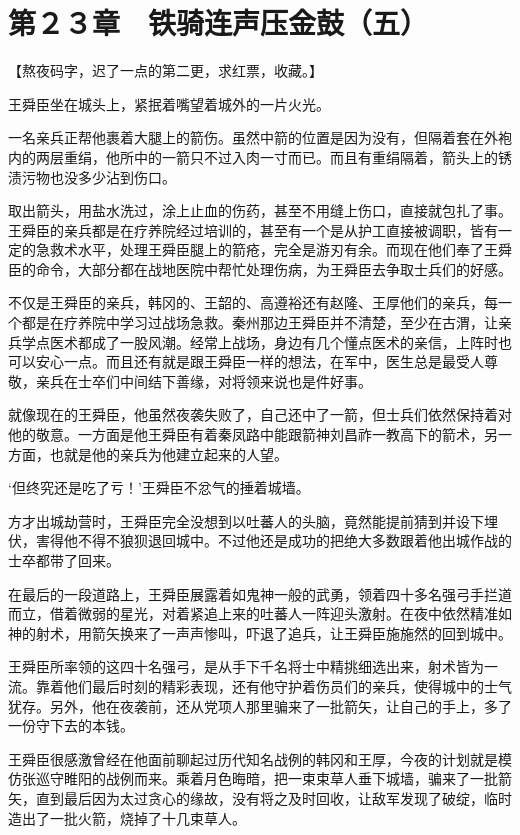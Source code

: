 \section{第２３章　铁骑连声压金鼓（五）}

【熬夜码字，迟了一点的第二更，求红票，收藏。】

王舜臣坐在城头上，紧抿着嘴望着城外的一片火光。

一名亲兵正帮他裹着大腿上的箭伤。虽然中箭的位置是因为没有，但隔着套在外袍内的两层重绢，他所中的一箭只不过入肉一寸而已。而且有重绢隔着，箭头上的锈渍污物也没多少沾到伤口。

取出箭头，用盐水洗过，涂上止血的伤药，甚至不用缝上伤口，直接就包扎了事。王舜臣的亲兵都是在疗养院经过培训的，甚至有一个是从护工直接被调职，皆有一定的急救术水平，处理王舜臣腿上的箭疮，完全是游刃有余。而现在他们奉了王舜臣的命令，大部分都在战地医院中帮忙处理伤病，为王舜臣去争取士兵们的好感。

不仅是王舜臣的亲兵，韩冈的、王韶的、高遵裕还有赵隆、王厚他们的亲兵，每一个都是在疗养院中学习过战场急救。秦州那边王舜臣并不清楚，至少在古渭，让亲兵学点医术都成了一股风潮。经常上战场，身边有几个懂点医术的亲信，上阵时也可以安心一点。而且还有就是跟王舜臣一样的想法，在军中，医生总是最受人尊敬，亲兵在士卒们中间结下善缘，对将领来说也是件好事。

就像现在的王舜臣，他虽然夜袭失败了，自己还中了一箭，但士兵们依然保持着对他的敬意。一方面是他王舜臣有着秦凤路中能跟箭神刘昌祚一教高下的箭术，另一方面，也就是他的亲兵为他建立起来的人望。

‘但终究还是吃了亏！’王舜臣不忿气的捶着城墙。

方才出城劫营时，王舜臣完全没想到以吐蕃人的头脑，竟然能提前猜到并设下埋伏，害得他不得不狼狈退回城中。不过他还是成功的把绝大多数跟着他出城作战的士卒都带了回来。

在最后的一段道路上，王舜臣展露着如鬼神一般的武勇，领着四十多名强弓手拦道而立，借着微弱的星光，对着紧追上来的吐蕃人一阵迎头激射。在夜中依然精准如神的射术，用箭矢换来了一声声惨叫，吓退了追兵，让王舜臣施施然的回到城中。

王舜臣所率领的这四十名强弓，是从手下千名将士中精挑细选出来，射术皆为一流。靠着他们最后时刻的精彩表现，还有他守护着伤员们的亲兵，使得城中的士气犹存。另外，他在夜袭前，还从党项人那里骗来了一批箭矢，让自己的手上，多了一份守下去的本钱。

王舜臣很感激曾经在他面前聊起过历代知名战例的韩冈和王厚，今夜的计划就是模仿张巡守睢阳的战例而来。乘着月色晦暗，把一束束草人垂下城墙，骗来了一批箭矢，直到最后因为太过贪心的缘故，没有将之及时回收，让敌军发现了破绽，临时造出了一批火箭，烧掉了十几束草人。

